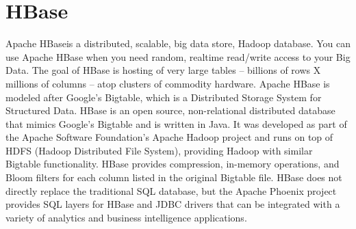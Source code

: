 \section{HBase}

Apache HBase\cite{hid-sp18-515-www-hbase}is a distributed, scalable, 
big data store, Hadoop database. 
You can use Apache HBase when you need random, realtime read/write 
access to your Big Data.
The goal of HBase is hosting of very large tables -- billions of rows 
X millions of columns -- atop clusters of commodity hardware.
Apache HBase is modeled after Google's Bigtable, which is a Distributed 
Storage System for Structured Data.
HBase is an open source, non-relational distributed database that 
mimics Google's Bigtable and is written in Java. It was developed as
part of the Apache Software Foundation's Apache Hadoop project and 
runs on top of HDFS (Hadoop Distributed File System), providing 
Hadoop with similar Bigtable functionality. 
HBase provides compression, in-memory operations, and Bloom filters 
for each column listed in the original Bigtable file.
HBase does not directly replace the traditional SQL database, but 
the Apache Phoenix project provides SQL layers for HBase and JDBC 
drivers that can be integrated with a variety of analytics and 
business intelligence applications.
